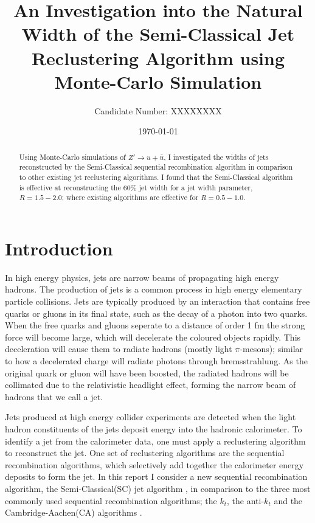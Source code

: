 \documentclass[a4paper,11pt, onecolumn]{article}
\title{\vspace{-1 in} An Investigation into the Natural Width of the Semi-Classical Jet Reclustering Algorithm using Monte-Carlo Simulation \vspace{-1ex}}
\author{Candidate Number: XXXXXXXX\vspace{-2ex}}
\date{\today}
\begin{document}
    \maketitle
    \begin{abstract}
     
         \normalsize
         Using Monte-Carlo simulations of $Z' \to u + \bar{u}$, I investigated the widths of jets reconstructed by the Semi-Classical sequential recombination
         algorithm in comparison to other existing jet reclustering algorithms. I found that the Semi-Classical algorithm
         is effective at reconstructing the 60\% jet width for a jet width parameter, $R = 1.5-2.0$; where existing algorithms are effective
         for $R = 0.5-1.0$.
   


    \end{abstract}


\section*{Introduction}

 In high energy physics, jets are narrow beams of propagating high energy hadrons. 
 The production of jets is a common process in high energy elementary particle collisions. Jets are typically 
 produced by an interaction that contains free quarks or gluons in its final state, such as the decay of a photon into two quarks. When 
 the free quarks and gluons seperate to a distance of order 1 fm the strong force will become large, which will decelerate the coloured
 objects rapidly. This deceleration will cause them to radiate hadrons (mostly light $\pi$-mesons); similar to how a decelerated charge will radiate photons through 
 bremsstrahlung. As the original quark or gluon will have been boosted, the radiated hadrons will be collimated due to the relativistic headlight 
 effect, forming the narrow beam of hadrons that we call a jet. \cite{HalzenMartin} \newline

 Jets produced at high energy collider experiments are detected when the light hadron constituents of the jets deposit energy
 into the hadronic calorimeter. To identify a jet from the calorimeter data, one must apply a reclustering algorithm to reconstruct the jet.
 One set of reclustering algorithms are the sequential recombination algorithms, which selectively add together the calorimeter energy deposits to form the jet.
 In this report I consider a new sequential recombination algorithm, the Semi-Classical(SC)
 jet algorithm \cite{sc}, in comparison to the three most commonly used sequential recombination algorithms;
 the $k_t$, the anti-$k_t$ and the Cambridge-Aachen(CA) algorithms \cite{salam}. \newline
\end{document}
